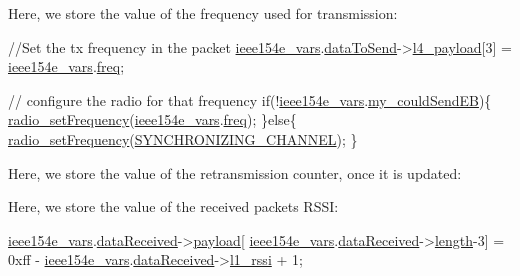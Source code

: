 Here, we store the value of the frequency used for transmission\+: 
\begin{DoxyCodeInclude}
   \textcolor{comment}{//Set the tx frequency in the packet}
   \hyperlink{_i_e_e_e802154_e_8c_abbfc7f36c7b2d2635f4407908445a89b}{ieee154e\_vars}.\hyperlink{structieee154e__vars__t_a88449ac7a09ec14e0053fdcf6a6ac790}{dataToSend}->\hyperlink{struct_open_queue_entry__t_a1c9c4a2da1e43eb8d9fd2b310f9f524e}{l4\_payload}[3] = 
      \hyperlink{_i_e_e_e802154_e_8c_abbfc7f36c7b2d2635f4407908445a89b}{ieee154e\_vars}.\hyperlink{structieee154e__vars__t_a98c1bb462ffdc5720382fc437a7893a3}{freq};
   
   \textcolor{comment}{// configure the radio for that frequency}
    \textcolor{keywordflow}{if}(!\hyperlink{_i_e_e_e802154_e_8c_abbfc7f36c7b2d2635f4407908445a89b}{ieee154e\_vars}.\hyperlink{structieee154e__vars__t_ace57dfc664b0948d066507ff4f7a77ff}{my\_couldSendEB})\{
        \hyperlink{group__radio_gaa062a57421da7b960a2613e4f65d3a11}{radio\_setFrequency}(\hyperlink{_i_e_e_e802154_e_8c_abbfc7f36c7b2d2635f4407908445a89b}{ieee154e\_vars}.\hyperlink{structieee154e__vars__t_a98c1bb462ffdc5720382fc437a7893a3}{freq});
    \}\textcolor{keywordflow}{else}\{
        \hyperlink{group__radio_gaa062a57421da7b960a2613e4f65d3a11}{radio\_setFrequency}(\hyperlink{group___i_e_e_e802154_e_gaf8be83417584fa06ecb6982f183bd222}{SYNCHRONIZING\_CHANNEL});
    \}
\end{DoxyCodeInclude}
 Here, we store the value of the retransmission counter, once it is updated\+: 
\begin{DoxyCodeInclude}
\end{DoxyCodeInclude}
 Here, we store the value of the received packet\textquotesingle{}s R\+S\+SI\+: 
\begin{DoxyCodeInclude}
      \hyperlink{_i_e_e_e802154_e_8c_abbfc7f36c7b2d2635f4407908445a89b}{ieee154e\_vars}.\hyperlink{structieee154e__vars__t_afeb8cae851f042cb066c4b482fe519b3}{dataReceived}->\hyperlink{struct_open_queue_entry__t_aeeaf66f25c665e41a219c4097e5085da}{payload}[
      \hyperlink{_i_e_e_e802154_e_8c_abbfc7f36c7b2d2635f4407908445a89b}{ieee154e\_vars}.\hyperlink{structieee154e__vars__t_afeb8cae851f042cb066c4b482fe519b3}{dataReceived}->\hyperlink{struct_open_queue_entry__t_aa3cf5004f2ac9ef3a888f42e726a5cce}{length}-3] = 0xff - 
      \hyperlink{_i_e_e_e802154_e_8c_abbfc7f36c7b2d2635f4407908445a89b}{ieee154e\_vars}.\hyperlink{structieee154e__vars__t_afeb8cae851f042cb066c4b482fe519b3}{dataReceived}->\hyperlink{struct_open_queue_entry__t_ae28cb0e81313085c3227cebe8ccecf33}{l1\_rssi} + 1;
\end{DoxyCodeInclude}
 


